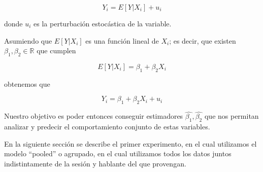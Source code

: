 \begin{equation}
  Y_i = E[Y|X_i] + u_i
\end{equation}

donde $u_i$ es la perturbación estocástica de la variable.

Asumiendo que $E[Y|X_i]$ es una función lineal de $X_i$; es decir, que existen $\beta_1, \beta_2 \in \mathbb{R}$ que cumplen

\begin{equation}
  E[Y|X_i] = \beta_1 + \beta_2 X_i
\end{equation}

obtenemos que

\begin{equation}
  Y_i = \beta_1 + \beta_2 X_i + u_i
\end{equation}

Nuestro objetivo es poder entonces conseguir estimadores $\widehat{\beta_1}, \widehat{\beta_2}$ que nos permitan analizar y predecir el comportamiento conjunto de estas variables.

En la siguiente sección se describe el primer experimento, en el cual utilizamos el modelo ``pooled'' o agrupado, en el cual utilizamos todos los datos juntos indistintamente de la sesión y hablante del que provengan.






